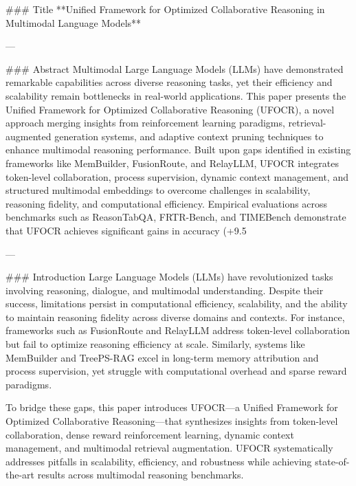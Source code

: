 ### Title
**Unified Framework for Optimized Collaborative Reasoning in Multimodal Language Models**

---

### Abstract
Multimodal Large Language Models (LLMs) have demonstrated remarkable capabilities across diverse reasoning tasks, yet their efficiency and scalability remain bottlenecks in real-world applications. This paper presents the Unified Framework for Optimized Collaborative Reasoning (UFOCR), a novel approach merging insights from reinforcement learning paradigms, retrieval-augmented generation systems, and adaptive context pruning techniques to enhance multimodal reasoning performance. Built upon gaps identified in existing frameworks like MemBuilder, FusionRoute, and RelayLLM, UFOCR integrates token-level collaboration, process supervision, dynamic context management, and structured multimodal embeddings to overcome challenges in scalability, reasoning fidelity, and computational efficiency. Empirical evaluations across benchmarks such as ReasonTabQA, FRTR-Bench, and TIMEBench demonstrate that UFOCR achieves significant gains in accuracy (+9.5%

---

### Introduction
Large Language Models (LLMs) have revolutionized tasks involving reasoning, dialogue, and multimodal understanding. Despite their success, limitations persist in computational efficiency, scalability, and the ability to maintain reasoning fidelity across diverse domains and contexts. For instance, frameworks such as FusionRoute and RelayLLM address token-level collaboration but fail to optimize reasoning efficiency at scale. Similarly, systems like MemBuilder and TreePS-RAG excel in long-term memory attribution and process supervision, yet struggle with computational overhead and sparse reward paradigms.

To bridge these gaps, this paper introduces UFOCR—a Unified Framework for Optimized Collaborative Reasoning—that synthesizes insights from token-level collaboration, dense reward reinforcement learning, dynamic context management, and multimodal retrieval augmentation. UFOCR systematically addresses pitfalls in scalability, efficiency, and robustness while achieving state-of-the-art results across multimodal reasoning benchmarks. 

